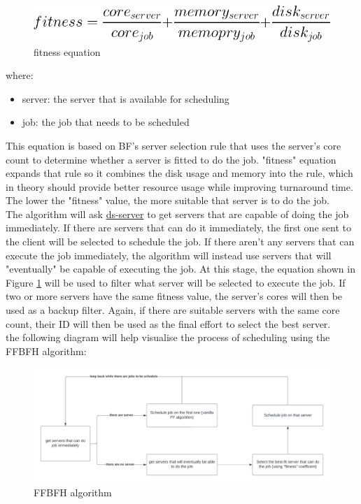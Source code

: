 \documentclass[a4paper]{article} %
\begin{document}
\begin{figure}[h!]
    \centering
    \includegraphics[scale = 0.5]{img/fitness.png}
    \caption{fitness equation}
    \label{fig:fig1}
\end{figure}
where:
\begin{itemize}
    \item server: the server that is available for scheduling
    \item job: the job that needs to be scheduled
\end{itemize}
This equation is based on BF's server selection rule that uses the server's core count to determine whether a server is fitted to do the job. "fitness" equation expands that rule so it combines the disk usage and memory into the rule, which in theory should provide better resource usage while improving turnaround time. The lower the "fitness" value, the more suitable that server is to do the job.\\
The algorithm will ask \href{https://github.com/distsys-MQ/ds-sim}{ds-server} \cite{ds-sim} to get servers that are capable of doing the job immediately. If there are servers that can do it immediately, the first one sent to the client will be selected to schedule the job. If there aren't any servers that can execute the job immediately, the algorithm will instead use servers that will "eventually" be capable of executing the job. At this stage, the equation shown in Figure \ref{fig:fig1} will be used to filter what server will be selected to execute the job. If two or more servers have the same fitness value, the server's cores will then be used as a backup filter. Again, if there are suitable servers with the same core count, their ID will then be used as the final effort to select the best server.\\
the following diagram will help visualise the process of scheduling using the FFBFH algorithm:
\begin{figure}[h!]
    \centering
    \includegraphics[scale = 0.125]{img/algorithm.png}
    \caption{FFBFH algorithm}
    \label{fig:fig2}
\end{figure}
\end{document}
